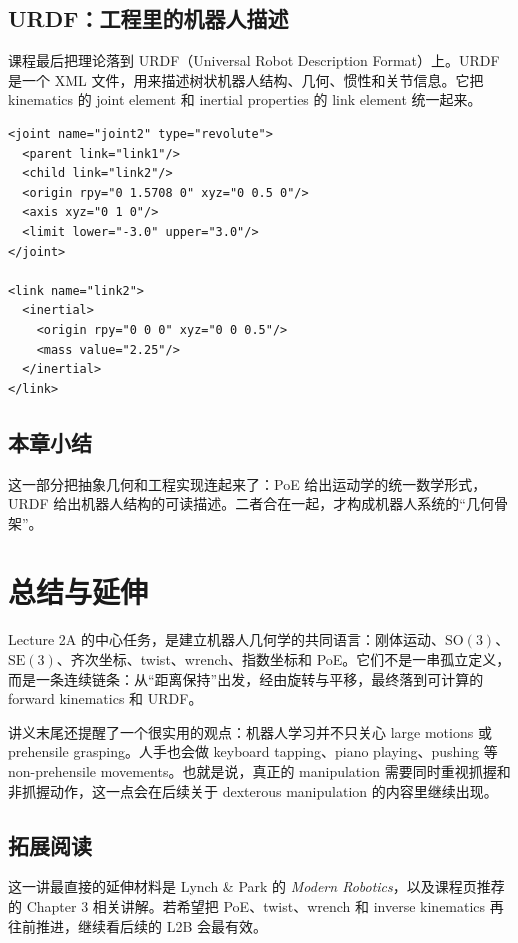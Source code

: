 \documentclass[a4paper]{article}
\begin{document}
\subsection{URDF：工程里的机器人描述}
课程最后把理论落到 URDF（Universal Robot Description Format）上。URDF 是一个 XML 文件，用来描述树状机器人结构、几何、惯性和关节信息。它把 kinematics 的 joint element 和 inertial properties 的 link element 统一起来。

\begin{lstlisting}[caption={URDF 中 joint 和 link 的简化示意}]
<joint name="joint2" type="revolute">
  <parent link="link1"/>
  <child link="link2"/>
  <origin rpy="0 1.5708 0" xyz="0 0.5 0"/>
  <axis xyz="0 1 0"/>
  <limit lower="-3.0" upper="3.0"/>
</joint>

<link name="link2">
  <inertial>
    <origin rpy="0 0 0" xyz="0 0 0.5"/>
    <mass value="2.25"/>
  </inertial>
</link>
\end{lstlisting}

\subsection{本章小结}
这一部分把抽象几何和工程实现连起来了：PoE 给出运动学的统一数学形式，URDF 给出机器人结构的可读描述。二者合在一起，才构成机器人系统的“几何骨架”。

\section{总结与延伸}
Lecture 2A 的中心任务，是建立机器人几何学的共同语言：刚体运动、\(\mathrm{SO}(3)\)、\(\mathrm{SE}(3)\)、齐次坐标、twist、wrench、指数坐标和 PoE。它们不是一串孤立定义，而是一条连续链条：从“距离保持”出发，经由旋转与平移，最终落到可计算的 forward kinematics 和 URDF。

讲义末尾还提醒了一个很实用的观点：机器人学习并不只关心 large motions 或 prehensile grasping。人手也会做 keyboard tapping、piano playing、pushing 等 non-prehensile movements。也就是说，真正的 manipulation 需要同时重视抓握和非抓握动作，这一点会在后续关于 dexterous manipulation 的内容里继续出现。

\subsection{拓展阅读}
这一讲最直接的延伸材料是 Lynch \& Park 的 \emph{Modern Robotics}，以及课程页推荐的 Chapter 3 相关讲解。若希望把 PoE、twist、wrench 和 inverse kinematics 再往前推进，继续看后续的 L2B 会最有效。
\end{document}
